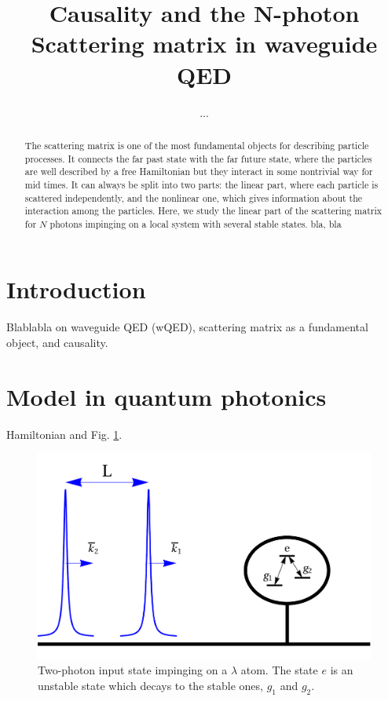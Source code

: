 \documentclass[aps,pra,reprint,amsmath,amssymb]{revtex4-1}
\begin{document}
\title{Causality and the N-photon Scattering matrix in waveguide QED}

\author{...}


\begin{abstract}
The scattering matrix is one of the most fundamental objects for
describing particle processes. It connects the far past state with the
far future state, where the particles are well described by a free
Hamiltonian but they interact in some nontrivial way
for mid times. It can always be split into two parts: the linear part,
where each particle is scattered independently, and the nonlinear one,
which gives information about the interaction among the
particles. Here, we study the linear part of the scattering matrix for
$N$ photons impinging on a local system with several stable states. 
bla, bla
\end{abstract}



\maketitle


\section{Introduction}

Blablabla on waveguide QED (wQED), scattering matrix as a fundamental object, and causality. \cite{weinberg1995,Xu2016}


\section{Model in quantum photonics} 

Hamiltonian and Fig. \ref{fig:input}.

\begin{figure}
\includegraphics[scale=0.25]{input.pdf}
\caption{Two-photon input state impinging on a $\lambda$ atom. The state $e$ is an unstable state which decays to the stable ones, $g_1$ and $g_2$.}
\label{fig:input}
\end{figure}
\end{document}

